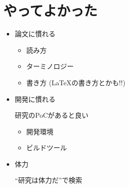 \documentclass[unicode,compress,14pt,CJK%
\directlua{
    handout = os.getenv"HANDOUT"
    local _ = handout and tex.print(",handout")
},t]{beamer}
\begin{document}
\section{やってよかった}
\begin{frame}
    \frametitlesec

    \begin{itemize}
        \item 論文に慣れる

            \begin{itemize}
                \item 読み方
                \item ターミノロジー
                \item 書き方 (\LaTeX の書き方とかも!!)
            \end{itemize}
        \item 開発に慣れる

            研究のPoCがあると良い

            \begin{itemize}
                \item 開発環境
                \item ビルドツール
            \end{itemize}
        \item {}体力

            ``研究は体力だ''で検索
    \end{itemize}
\end{frame}
\end{document}
